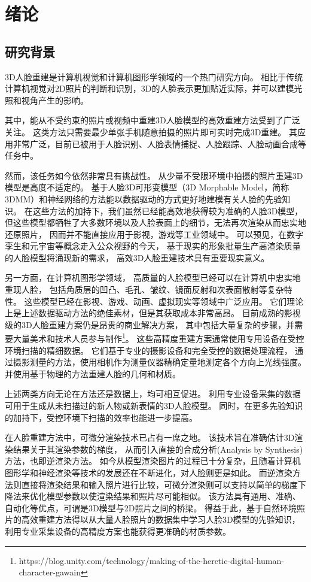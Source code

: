 \chapter{绪论}
\label{chap:intro}

\section{研究背景}

3D人脸重建是计算机视觉和计算机图形学领域的一个热门研究方向。
相比于传统计算机视觉对2D照片的判断和识别，3D的人脸表示更加贴近实际，并可以建模光照和视角产生的影响。

其中，能从不受约束的照片或视频中重建3D人脸模型的高效重建方法受到了广泛关注。
这类方法只需要最少单张手机随意拍摄的照片即可实时完成3D重建。
其应用非常广泛，目前已被用于人脸识别\citep{BlanzV03,1022631413.nh}、人脸表情捕捉\cite{Mo2022TowardsAF}、人脸跟踪\citep{Pham2016RobustRP}、人脸动画合成\citep{Cao20133DSR}等任务中。

然而，该任务如今依然非常具有挑战性。
从少量不受限环境中拍摄的照片重建3D模型是高度不适定的。
基于人脸3D可形变模型（3D Morphable Model，简称3DMM）和神经网络的方法能以数据驱动的方式更好地建模有关人脸的先验知识。
在这些方法的加持下，我们虽然已经能高效地获得较为准确的人脸3D模型，
但这些模型都牺牲了大多数环境以及人脸表面上的细节，无法再次渲染从而忠实地还原照片，
因而并不能直接应用于影视，游戏等工业领域中。
可以预见，在数字孪生和元宇宙等概念走入公众视野的今天，
基于现实的形象批量生产高渲染质量的人脸模型将涌现新的需求，
高效3D人脸重建技术具有重要现实意义。

另一方面，在计算机图形学领域，
高质量的人脸模型已经可以在计算机中忠实地重现人脸，
包括角质层的凹凸、毛孔、皱纹、镜面反射和次表面散射等复杂特性。
这些模型已经在影视、游戏、动画、虚拟现实等领域中广泛应用。
它们理论上是上述数据驱动方法的绝佳素材，但是其获取成本非常高昂。
目前成熟的影视级的3D人脸重建方案仍是昂贵的商业解决方案，
其中包括大量复杂的步骤，并需要大量美术和技术人员参与制作\footnote{https://blog.unity.com/technology/making-of-the-heretic-digital-human-character-gawain}。
这些高精度重建方案通常使用专用设备在受控环境扫描的精细数据。
它们基于专业的摄影设备和完全受控的数据处理流程，
通过摄影测量的方法，使用相机作为测量仪器精确定量地测定各个方向上光线强度。
并使用基于物理的方法重建人脸的几何和材质。

上述两类方向无论在方法还是数据上，均可相互促进。
利用专业设备采集的数据可用于生成从未扫描过的新人物或新表情的3D人脸模型。
同时，在更多先验知识的加持下，受控环境下扫描的效率也能进一步提高。

在人脸重建方法中，可微分渲染技术已占有一席之地。
该技术旨在准确估计3D渲染结果关于其渲染参数的梯度，
从而引入直接的合成分析(Analysis by Synthesis)方法，也即逆渲染方法。
如今从模型渲染图片的过程已十分复杂，且随着计算机图形学和神经渲染等技术的发展还在不断进化，对人脸则更是如此。
而逆渲染方法则直接将渲染结果和输入照片进行比较，可微分渲染则可以支持以简单的梯度下降法来优化模型参数以使渲染结果和照片尽可能相似。
该方法具有通用、准确、自动化等优点，可谓是3D模型与2D照片之间的桥梁。
得益于此，基于自然环境照片的高效重建方法得以从大量人脸照片的数据集中学习人脸3D模型的先验知识，
利用专业采集设备的高精度方案也能获得更准确的材质参数。

